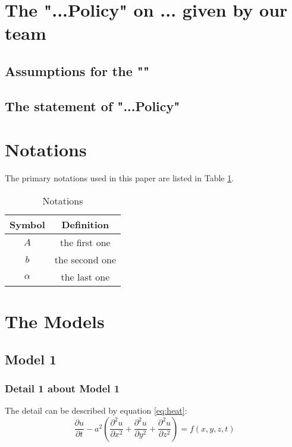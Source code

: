 \documentclass[12pt]{article}  %
\begin{document}
\section{The "...Policy" on ... given by our team}
\subsection{Assumptions for the ""}
\subsection{The statement of "...Policy"}


\section{Notations}
The primary notations used in this paper are listed in Table \ref{tb:notation}.
\begin{table}[!htbp]
\begin{center}
\caption{Notations}
\begin{tabular}{c c}
	\toprule
	\multicolumn{1}{m{3cm}}{\centering Symbol}
	&\multicolumn{1}{m{8cm}}{\centering Definition}\\
	\midrule
	$A$&the first one\\
	$b$&the second one\\
	$\alpha$ &the last one\\
	\bottomrule
\end{tabular}\label{tb:notation}
\end{center}
\end{table}

\section{The Models}
\subsection{Model 1}
\subsubsection{Detail 1 about Model 1}
The detail can be described by equation \eqref{eq:heat}:
\begin{equation}\label{eq:heat}
\frac{\partial u}{\partial t} - a^2 \left( \frac{\partial^2 u}{\partial x^2} + \frac{\partial^2 u}{\partial y^2} + \frac{\partial^2 u}{\partial z^2} \right) = f(x, y, z, t)
\end{equation}
\end{document}
